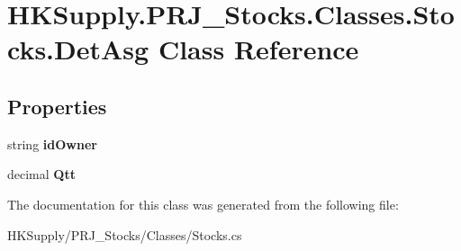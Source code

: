 \hypertarget{class_h_k_supply_1_1_p_r_j___stocks_1_1_classes_1_1_stocks_1_1_det_asg}{}\section{H\+K\+Supply.\+P\+R\+J\+\_\+\+Stocks.\+Classes.\+Stocks.\+Det\+Asg Class Reference}
\label{class_h_k_supply_1_1_p_r_j___stocks_1_1_classes_1_1_stocks_1_1_det_asg}
\subsection*{Properties}
\begin{DoxyCompactItemize}
\item 
\mbox{\label{class_h_k_supply_1_1_p_r_j___stocks_1_1_classes_1_1_stocks_1_1_det_asg_a56567021522a2edc730fc9c662a87b5d}} 
string {\bfseries id\+Owner}
\item 
\mbox{\label{class_h_k_supply_1_1_p_r_j___stocks_1_1_classes_1_1_stocks_1_1_det_asg_a997de6a031f05fcddd2341945eb7e29f}} 
decimal {\bfseries Qtt}
\end{DoxyCompactItemize}


The documentation for this class was generated from the following file\+:\begin{DoxyCompactItemize}
\item 
H\+K\+Supply/\+P\+R\+J\+\_\+\+Stocks/\+Classes/Stocks.\+cs\end{DoxyCompactItemize}
